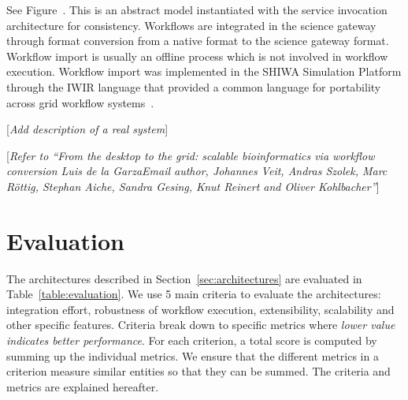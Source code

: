 \documentclass[preprint,3p,twocolumn]{elsarticle}
\newcommand{\todo}[1]{\color{blue}\xspace[\emph{#1}]\xspace\color{black}}
\begin{document}
See Figure~. This is an abstract model 
instantiated with the service invocation architecture for
consistency. Workflows are integrated in the science gateway through
format conversion from a native format to the science gateway
format. Workflow import is usually an offline process which is not
involved in workflow execution. Workflow import was implemented in the SHIWA
Simulation Platform through the IWIR language that provided a common
language for portability across grid workflow
systems~\cite{plankensteiner-prodan-etal:2013}.

\todo{Add description of a real system}

\todo{Refer to ``From the desktop to the grid: scalable bioinformatics via workflow conversion Luis de la GarzaEmail author, Johannes Veit, Andras Szolek, Marc Röttig, Stephan Aiche, Sandra Gesing, Knut Reinert and Oliver Kohlbacher''}

\section{Evaluation}

\label{sec:evaluation}

The architectures described in Section~\ref{sec:architectures} are
evaluated in Table~\ref{table:evaluation}. We use 5 main criteria to
evaluate the architectures: integration effort, robustness of workflow
execution, extensibility, scalability and other specific
features. Criteria break down to specific metrics where \emph{lower
  value indicates better performance}. For each criterion, a total
score is computed by summing up the individual metrics. We ensure that
the different metrics in a criterion measure similar entities so that
they can be summed. The criteria and metrics are explained hereafter.
\end{document}
